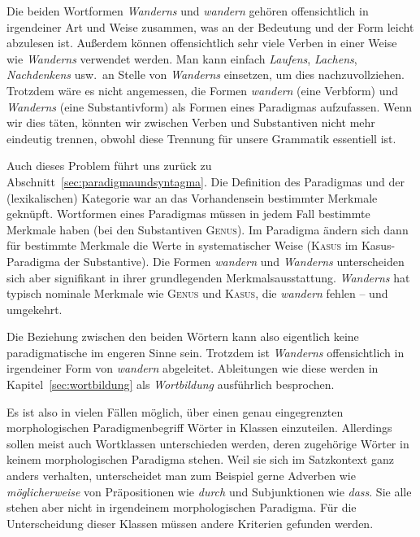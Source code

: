 Die beiden Wortformen \textit{Wanderns} und \textit{wandern} gehören offensichtlich in irgendeiner Art und Weise zusammen, was an der Bedeutung und der Form leicht abzulesen ist.
Außerdem können offensichtlich sehr viele Verben in einer Weise wie \textit{Wanderns} verwendet werden.
Man kann einfach \textit{Laufens}, \textit{Lachens}, \textit{Nachdenkens} usw.\ an Stelle von \textit{Wanderns} einsetzen, um dies nachzuvollziehen.
Trotzdem wäre es nicht angemessen, die Formen \textit{wandern} (eine Verbform) und \textit{Wanderns} (eine Substantivform) als Formen eines Paradigmas aufzufassen.
Wenn wir dies täten, könnten wir zwischen Verben und Substantiven nicht mehr eindeutig trennen, obwohl diese Trennung für unsere Grammatik essentiell ist.

Auch dieses Problem führt uns zurück zu Abschnitt~\ref{sec:paradigmaundsyntagma}.
Die Definition des Paradigmas und der (lexikalischen) Kategorie war an das Vorhandensein bestimmter Merkmale geknüpft.
Wortformen eines Paradigmas müssen in jedem Fall bestimmte Merkmale haben (bei den Substantiven \zB \textsc{Genus}).
Im Paradigma ändern sich dann für bestimmte Merkmale die Werte in systematischer Weise (\zB \textsc{Kasus} im Kasus-Paradigma der Substantive).
Die Formen \textit{wandern} und \textit{Wanderns} unterscheiden sich aber signifikant in ihrer grundlegenden Merkmalsausstattung.
\textit{Wanderns} hat typisch nominale Merkmale wie \textsc{Genus} und \textsc{Kasus}, die \textit{wandern} fehlen -- und umgekehrt.

\begin{exe}
\end{exe}


Die Beziehung zwischen den beiden Wörtern kann also eigentlich keine paradigmatische im engeren Sinne sein.
Trotzdem ist \textit{Wanderns} offensichtlich in irgendeiner Form von \textit{wandern} abgeleitet.
Ableitungen wie diese werden in Kapitel~\ref{sec:wortbildung} als \textit{Wortbildung} ausführlich besprochen.

Es ist also in vielen Fällen möglich, über einen genau eingegrenzten morphologischen Paradigmenbegriff Wörter in Klassen einzuteilen.
Allerdings sollen meist auch Wortklassen unterschieden werden, deren zugehörige Wörter in keinem morphologischen Paradigma stehen.
Weil sie sich im Satzkontext ganz anders verhalten, unterscheidet man zum Beispiel gerne Adverben wie \textit{möglicherweise} von Präpositionen wie \textit{durch} und Subjunktionen wie \textit{dass}.
Sie alle stehen aber nicht in irgendeinem morphologischen Paradigma.
Für die Unterscheidung dieser Klassen müssen andere Kriterien gefunden werden.

